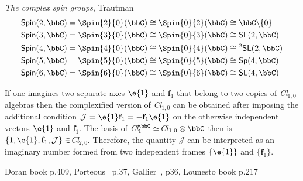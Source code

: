 \begin{unit}\textit{The complex spin groups}, Trautman~\cite{Trautman06}
\[\begin{split}
&\mathsf{Spin}(2,\bbC)=\Spin{2}{0}(\bbC)\cong\Spin{0}{2}(\bbC)\cong\bbC\backslash\{0\}\\
&\mathsf{Spin}(3,\bbC)=\Spin{3}{0}(\bbC)\cong\Spin{0}{3}(\bbC)\cong\mathsf{SL}(2,\bbC)\\
&\mathsf{Spin}(4,\bbC)=\Spin{4}{0}(\bbC)\cong\Spin{0}{4}(\bbC)\cong{^2\mathsf{SL}(2,\bbC)}\\
&\mathsf{Spin}(5,\bbC)=\Spin{5}{0}(\bbC)\cong\Spin{0}{5}(\bbC)\cong\mathsf{Sp}(4,\bbC)\\
&\mathsf{Spin}(6,\bbC)=\Spin{6}{0}(\bbC)\cong\Spin{0}{6}(\bbC)\cong\mathsf{SL}(4,\bbC)\\
\end{split}\]
\end{unit}
%
\begin{example} If one imagines two separate  axes $\e{1}$ and
$\mathbf{f}_1$ that belong to two copies of  \textit{Cl}$_{1,0}$
algebras then the complexified version of \textit{Cl}$_{1,0}$ can
be obtained after imposing the additional condition
$\mathcal{J}=\e{1}\mathbf{f}_1=-\mathbf{f}_1\e{1}$ on the
otherwise independent vectors $\e{1}$ and $\mathbf{f}_1$. The
basis of
\textit{Cl}$_{1}^{\bbC}\simeq$\textit{Cl}$_{1,0}\otimes\bbC$
then is
$\{1,\e{1},\mathbf{f}_1,\mathcal{J}\}\in$\textit{Cl}$_{2,0}$.
Therefore, the quantity $\mathcal{J}$ can be interpreted as an
imaginary number formed from two independent frames $\{\e{1}\}$
and $\{\mathbf{f}_1\}$.
\end{example}
  Doran book \cite{Doran03}
p.409, Porteous~\cite{Porteous04} p.37, Gallier~\cite{Gallier08},
p36, Lounesto book p.217



\endinput

